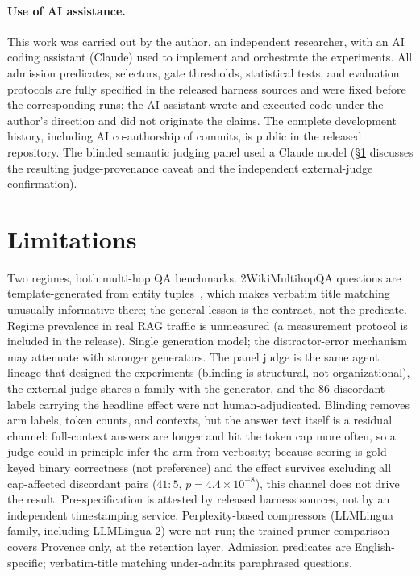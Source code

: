\documentclass[11pt]{article}
\begin{document}
\paragraph{Use of AI assistance.} This work was carried out by the author,
an independent researcher, with an AI coding assistant (Claude) used to
implement and orchestrate the experiments. All admission predicates,
selectors, gate thresholds, statistical tests, and evaluation protocols are
fully specified in the released harness sources and were fixed before the
corresponding runs; the AI assistant wrote and executed code under the
author's direction and did not originate the claims. The complete
development history, including AI co-authorship of commits, is public in the
released repository. The blinded semantic judging panel used a Claude model
(\S\ref{sec:limits} discusses the resulting judge-provenance caveat and the
independent external-judge confirmation).

\section{Limitations}
\label{sec:limits}

Two regimes, both multi-hop QA benchmarks. 2WikiMultihopQA questions are
template-generated from entity tuples~\citep{ho2020constructing}, which
makes verbatim title matching unusually informative there; the general
lesson is the contract, not the predicate. Regime prevalence in real RAG
traffic is unmeasured (a measurement protocol is included in the release).
Single generation model; the distractor-error mechanism may attenuate with
stronger generators. The panel judge is the same agent lineage that
designed the experiments (blinding is structural, not organizational), the
external judge shares a family with the generator, and the 86 discordant
labels carrying the headline effect were not human-adjudicated. Blinding
removes arm labels, token counts, and contexts, but the answer text itself
is a residual channel: full-context answers are longer and hit the token
cap more often, so a judge could in principle infer the arm from
verbosity; because scoring is gold-keyed binary correctness (not preference)
and the effect survives excluding all cap-affected discordant pairs
($41{:}5$, $p=4.4\times10^{-8}$), this channel does not drive the result.
Pre-specification is attested by released harness sources, not by an
independent timestamping service. Perplexity-based compressors
(LLMLingua family, including LLMLingua-2) were not run; the trained-pruner
comparison covers Provence only, at the retention layer. Admission
predicates are English-specific; verbatim-title matching under-admits
paraphrased questions.
\end{document}
